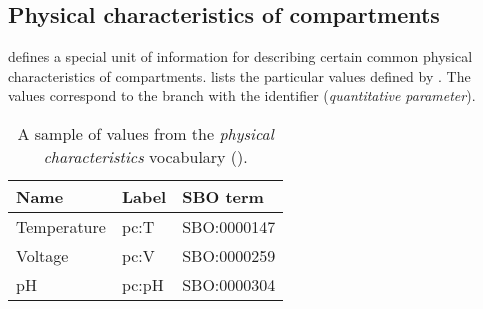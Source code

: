 \subsection{Physical characteristics of compartments}
\label{sec:af:physical-characteristics-cv}

\SBGNAFLone defines a special unit of information for describing certain common physical characteristics of compartments.   lists the particular values defined by \SBGNAFLone.  The values correspond to the \sbo branch with the identifier  (\emph{quantitative parameter}).

\begin{table}[h]
  \centering
  \begin{tabular}{l>{\ttfamily}l>{\ttfamily}l}
    \toprule
    \textbf{Name}   & \textbf{\rmfamily Label} & \textbf{\rmfamily SBO term} \\
    \midrule
    Temperature   & pc:T  & SBO:0000147\\
    Voltage       & pc:V  & SBO:0000259\\
    pH            & pc:pH & SBO:0000304\\
    \bottomrule
  \end{tabular}
  \caption{A sample of values from the \emph{physical
      characteristics} vocabulary ().}
  \label{tab:af:physical-characteristics-cv}
\end{table}



